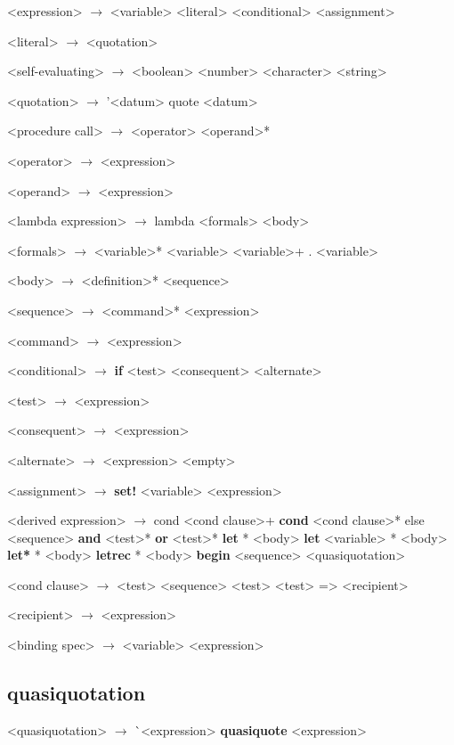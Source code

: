 \documentclass[11pt]{report}
\begin{document}
\begin{grammar}
  <expression> $\longrightarrow$ <variable>
  \alt <literal>
  \alt <conditional>
  \alt <assignment>

  <literal> $\longrightarrow$ <quotation> 

  <self-evaluating> $\longrightarrow$ <boolean> \alt <number>
  \alt <character> \alt <string>

  <quotation> $\longrightarrow$ '<datum> \alt \bop quote <datum> \bcp

  <procedure call> $\longrightarrow$ \bop <operator> <operand>* \bcp
  
  <operator> $\longrightarrow$ <expression>
  
  <operand> $\longrightarrow$ <expression>

  <lambda expression> $\longrightarrow$ \bop lambda <formals> <body> \bcp

  <formals> $\longrightarrow$ \bop <variable>* \bcp \alt <variable>
  \alt \bop <variable>+  .  <variable> \bcp

  <body> $\longrightarrow$ <definition>* <sequence>

  <sequence> $\longrightarrow$ <command>* <expression>

  <command> $\longrightarrow$ <expression>

  <conditional> $\longrightarrow$ \bop \textbf{if} <test> <consequent> <alternate> \bcp

  <test> $\longrightarrow$ <expression>

  <consequent> $\longrightarrow$ <expression>

  <alternate> $\longrightarrow$ <expression> \alt <empty>

  <assignment> $\longrightarrow$ \bop \textbf{set!} <variable> <expression> \bcp

  <derived expression> $\longrightarrow$ \bop cond <cond clause>+ \bcp
  \alt \bop \textbf{cond} <cond clause>* \bop else <sequence> \bcp \bcp
  \alt \bop \textbf{and} <test>* \bcp
  \alt \bop \textbf{or} <test>* \bcp
  \alt \bop \textbf{let} * \bcp <body> \bcp
  \alt \bop \textbf{let} <variable> * \bcp <body> \bcp
  \alt \bop \textbf{let*} * \bcp <body> \bcp
  \alt \bop \textbf{letrec} * \bcp <body> \bcp
  \alt \bop \textbf{begin} <sequence> \bcp
  \alt <quasiquotation>

  <cond clause> $\longrightarrow$ \bop <test> <sequence> \bcp
  \alt \bop <test> \bcp
  \alt \bop <test> => <recipient> \bcp

  <recipient> $\longrightarrow$ <expression>

  <binding spec> $\longrightarrow$ \bop <variable> <expression> \bcp
  
\end{grammar}

\subsection{quasiquotation}
\begin{grammar}
  <quasiquotation> $\longrightarrow$ \`{}<expression>
  \alt \bop \textbf{quasiquote} <expression> \bcp
\end{grammar}
\end{document}
